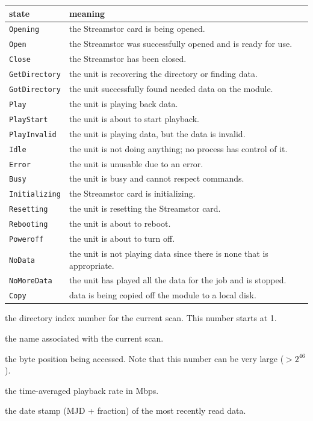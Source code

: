 \begin{description}
\begin{description}
\begin{tabular}{ll}
state & meaning \\
\hline
{\tt Opening} & the Streamstor card is being opened. \\
{\tt Open} & the Streamstor was successfully opened and is ready for use. \\
{\tt Close} & the Streamstor has been closed. \\
{\tt GetDirectory} & the unit is recovering the directory or finding data. \\
{\tt GotDirectory} & the unit successfully found needed data on the module. \\
{\tt Play} & the unit is playing back data. \\
{\tt PlayStart} & the unit is about to start playback. \\
{\tt PlayInvalid} & the unit is playing data, but the data is invalid. \\
{\tt Idle} & the unit is not doing anything; no process has control of it. \\
{\tt Error} & the unit is unusable due to an error. \\
{\tt Busy} & the unit is busy and cannot respect commands. \\
{\tt Initializing} & the Streamstor card is initializing. \\
{\tt Resetting} & the unit is resetting the Streamstor card. \\
{\tt Rebooting} & the unit is about to reboot. \\
{\tt Poweroff} & the unit is about to turn off. \\
{\tt NoData} & the unit is not playing data since there is none that is appropriate. \\
{\tt NoMoreData} & the unit has played all the data for the job and is stopped. \\
{\tt Copy} & data is being copied off the module to a local disk. \\
\end{tabular}

\item{} the directory index number for the current scan.
This number starts at 1.
\item{} the name associated with the current scan.
\item{} the byte position being accessed. 
Note that this number can be very large ($> 2^{46}$).
\item{} the time-averaged playback rate in Mbps.
\item{} the date stamp (MJD + fraction) of the most recently read data.
\end{description}








\end{description}
